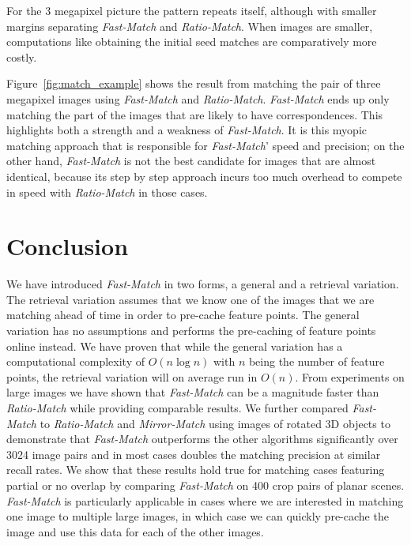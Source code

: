 \documentclass[10pt,twocolumn,letterpaper]{article}
\begin{document}
For the 3 megapixel picture the pattern repeats itself, although with smaller margins separating \emph{Fast-Match} and \emph{Ratio-Match}. When images are smaller, computations like obtaining the initial seed matches are comparatively more costly.

Figure~\ref{fig:match_example} shows the result from matching the pair of three megapixel images using \emph{Fast-Match} and \emph{Ratio-Match}. %
\emph{Fast-Match} ends up only matching the part of the images that are likely to have correspondences. This highlights both a strength and a weakness of \emph{Fast-Match}. It is this myopic matching approach that is responsible for \emph{Fast-Match}' speed and precision; on the other hand, \emph{Fast-Match} is not the best candidate for images that are almost identical, because its step by step approach incurs too much overhead to compete in speed with \emph{Ratio-Match} in those cases.

\section{Conclusion}
\label{conclusion}

We have introduced \emph{Fast-Match} in two forms, a general and a retrieval variation. The retrieval variation assumes that we know one of the images that we are matching ahead of time in order to pre-cache feature points. The general variation has no assumptions and performs the pre-caching of feature points online instead. 
We have proven that while the general variation has a computational complexity of $O(n \log n)$ with $n$ being the number of feature points, the retrieval variation will on average run in $O(n)$.
From experiments on large images we have shown that \emph{Fast-Match} can be a magnitude faster than \emph{Ratio-Match} while providing comparable results. We further compared \emph{Fast-Match} to \emph{Ratio-Match} and \emph{Mirror-Match} using images of rotated 3D objects to demonstrate that \emph{Fast-Match} outperforms the other algorithms significantly over 3024 image pairs and in most cases doubles the matching precision at similar recall rates. We show that these results hold true for matching cases featuring partial or no overlap by comparing \emph{Fast-Match} on 400 crop pairs of planar scenes.
\emph{Fast-Match} is particularly applicable in cases where we are interested in matching one image to multiple large images, in which case we can quickly pre-cache the image and use this data for each of the other images.



\end{document}
